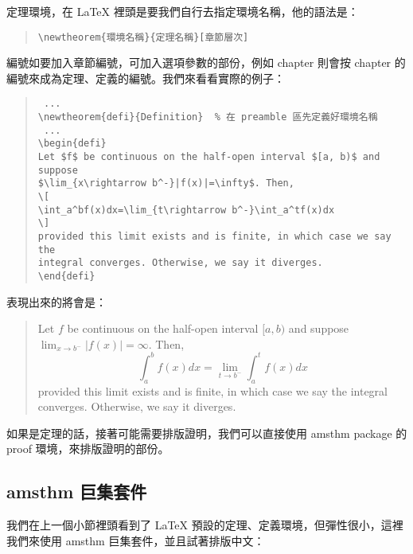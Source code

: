 定理環境，在 \LaTeX{} 裡頭是要我們自行去指定環境名稱，他的語法是：

\begin{quote}
  \begin{verbatim}
\newtheorem{環境名稱}{定理名稱}[章節層次]
\end{verbatim}
\end{quote}

編號如要加入章節編號，可加入選項參數的部份，例如 {\ttfamily chapter} 則會按 chapter 的編號來成為定理、定義的編號。我們來看看實際的例子：

\begin{quote}
  \begin{verbatim}
 ...
\newtheorem{defi}{Definition}  % 在 preamble 區先定義好環境名稱
 ...
\begin{defi}
Let $f$ be continuous on the half-open interval $[a, b)$ and suppose
$\lim_{x\rightarrow b^-}|f(x)|=\infty$. Then,
\[
\int_a^bf(x)dx=\lim_{t\rightarrow b^-}\int_a^tf(x)dx
\]
provided this limit exists and is finite, in which case we say the
integral converges. Otherwise, we say it diverges.
\end{defi}
\end{verbatim}
\end{quote}

表現出來的將會是：
\begin{quote}
  \begin{defi}
    Let $f$ be continuous on the half-open interval $[a, b)$ and suppose
    $\lim_{x\rightarrow b^-}|f(x)|=\infty$. Then,
    \[
      \int_a^bf(x)dx=\lim_{t\rightarrow b^-}\int_a^tf(x)dx
    \]
    provided this limit exists and is finite, in which case we say the
    integral converges. Otherwise, we say it diverges.
  \end{defi}
\end{quote}

如果是定理的話，接著可能需要排版證明，我們可以直接使用 {\sffamily amsthm} package 的 {\ttfamily proof} 環境，來排版證明的部份。

\subsection{amsthm 巨集套件}

我們在上一個小節裡頭看到了 \LaTeX{} 預設的定理、定義環境，但彈性很小，這裡我們來使用 {\sffamily amsthm} 巨集套件，並且試著排版中文：

